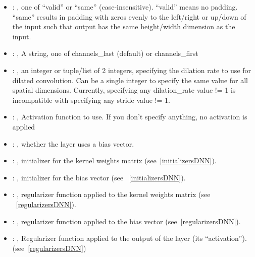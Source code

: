 \begin{itemize}
\begin{itemize}
        \item {}: , 
          one of ``valid'' or ``same'' (case-insensitive). ``valid'' means no padding. ``same''
          results in padding         with zeros evenly to the left/right or up/down of the input
          such that output has the same height/width         dimension as the input.

        \item {}: , 
          A string, one of channels\_last (default) or channels\_first

        \item {}: , 
          an integer or tuple/list of 2 integers, specifying the dilation rate to use for dilated
          convolution.         Can be a single integer to specify the same value for all spatial
          dimensions. Currently, specifying any         dilation\_rate value != 1 is incompatible
          with specifying any stride value != 1.

        \item {}: , 
          Activation function to use. If you don't specify anything, no activation is applied

        \item {}: , 
          whether the layer uses a bias vector.

        \item {}: , 
          initializer for the kernel weights matrix (see~\ref{initializersDNN}).

        \item {}: , 
          initializer for the bias vector (see ~\ref{initializersDNN}).

        \item {}: , 
          regularizer function applied to the kernel weights matrix (see ~\ref{regularizersDNN}).

        \item {}: , 
          regularizer function applied to the bias vector (see~\ref{regularizersDNN}).

        \item {}: , 
          Regularizer function applied to the output         of the layer (its ``activation'').
          (see~\ref{regularizersDNN})


\end{itemize}
\end{itemize}
